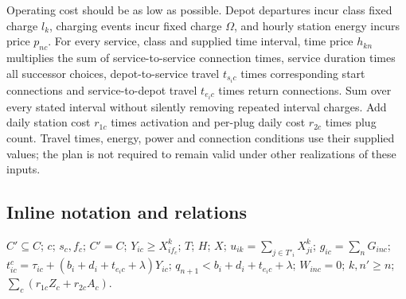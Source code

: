 \documentclass[10pt]{article}
\begin{document}
Operating cost should be as low as possible. Depot departures incur class fixed charge $l_k$, charging events incur fixed charge $\Omega$, and hourly station energy incurs price $p_{nc}$. For every service, class and supplied time interval, time price $h_{kn}$ multiplies the sum of service-to-service connection times, service duration times all successor choices, depot-to-service travel $t_{s_i c}$ times corresponding start connections and service-to-depot travel $t_{e_i c}$ times return connections. Sum over every stated interval without silently removing repeated interval charges. Add daily station cost $r_{1c}$ times activation and per-plug daily cost $r_{2c}$ times plug count. Travel times, energy, power and connection conditions use their supplied values; the plan is not required to remain valid under other realizations of these inputs.

\subsection*{Inline notation and relations}
$C'\subseteq C$; $c$; $s_c,f_c$; $C'=C$; $Y_{ic}\ge X^k_{if_c}$; $T$; $H$; $X$; $u_{ik}=\sum_{j\in T'_i}X^k_{ji}$; $g_{ic}=\sum_nG_{inc}$; $t^c_{ic}=\tau_{ic}+(b_i+d_i+t_{e_i c}+\lambda)Y_{ic}$; $q_{n+1}<b_i+d_i+t_{e_ic}+\lambda$; $W_{inc}=0$; $k,n'\ge n$; $\sum_c(r_{1c}Z_c+r_{2c}A_c)$.
\end{document}

